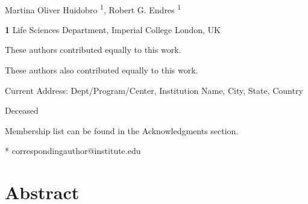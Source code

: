 \documentclass[10pt,letterpaper]{article}
\begin{document}
\vspace*{0.2in}

\begin{flushleft}
{\Large
\textbf{} %
}
\newline
\\
Martina Oliver Huidobro \textsuperscript{1},
Robert G. Endres \textsuperscript{1}


\bigskip
\textbf{1} Life Sciences Department, Imperial College London, UK
\\
\bigskip

% 
%
\Yinyang These authors contributed equally to this work.

\ddag These authors also contributed equally to this work.

\textcurrency Current Address: Dept/Program/Center, Institution Name, City, State, Country %

\dag Deceased

\textpilcrow Membership list can be found in the Acknowledgments section.

* correspondingauthor@institute.edu

\end{flushleft}
\section*{Abstract}
\end{document}
